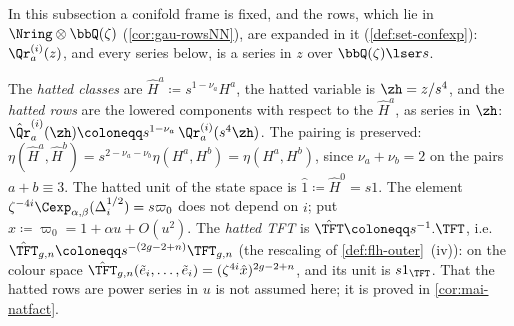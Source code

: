 In this subsection a conifold frame is fixed, and the rows, which lie in $\Nring\otimes\bbQ(\zeta)$ (\cref{cor:gau-rowsNN}), are expanded in it (\cref{def:set-confexp}): $\Qr^{(i)}_a(z)$, and every series below, is a series in $z$ over $\bbQ(\zeta)\lser s$.

\begin{defn}
\label{def:set-hat}
The \emph{hatted classes} are $\hat H^a\coloneqq s^{1-\nu_a}H^a$, the hatted variable is $\zh=z/s^4$, and the \emph{hatted rows} are the lowered components with respect to the $\hat H^a$, as series in $\zh$: $\hat\Qr^{(i)}_a(\zh)\coloneqq s^{1-\nu_a}\,\Qr^{(i)}_a(s^4\zh)$. The pairing is preserved: $\eta(\hat H^a,\hat H^b)=s^{2-\nu_a-\nu_b}\eta(H^a,H^b)=\eta(H^a,H^b)$, since $\nu_a+\nu_b=2$ on the pairs $a+b\equiv3$. The hatted unit of the state space is $\hat1\coloneqq\hat H^0=s1$. The element $\zeta^{-4i}\Cexp_{\alpha,\beta}(\Delta_i^{1/2})=s\varpi_0$ does not depend on $i$; put $\hat x\coloneqq\varpi_0=1+\alpha u+O(u^2)$. The \emph{hatted TFT} is $\hat\TFT\coloneqq s^{-1}.\TFT$, i.e.\ $\hat\TFT_{g,n}\coloneqq s^{-(2g-2+n)}\TFT_{g,n}$ (the rescaling of \cref{def:flh-outer}~(iv)): on the colour space $\hat\TFT_{g,n}(\tilde e_i,\dots,\tilde e_i)=(\zeta^{4i}\hat x)^{2g-2+n}$, and its unit is $s1_{\TFT}$. That the hatted rows are power series in $u$ is not assumed here; it is proved in \cref{cor:mai-natfact}.
\end{defn}

